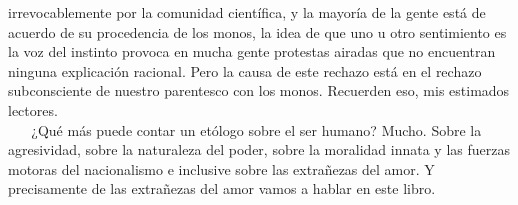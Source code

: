 irrevocablemente por la comunidad científica, y la mayoría de la gente
está de acuerdo de su procedencia de los monos, la idea de que uno u
otro sentimiento es la voz del instinto provoca en mucha gente protestas
airadas que no encuentran ninguna explicación racional. Pero la causa de
este rechazo está en el rechazo subconsciente de nuestro parentesco con
los monos. Recuerden eso, mis estimados lectores.\\
\hspace*{0.333em} ~ ~ ¿Qué más puede contar un etólogo sobre el ser
humano? Mucho. Sobre la agresividad, sobre la naturaleza del poder,
sobre la moralidad innata y las fuerzas motoras del nacionalismo e
inclusive sobre las extrañezas del amor. Y precisamente de las
extrañezas del amor vamos a hablar en este libro.
